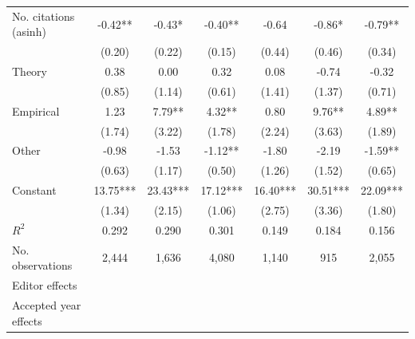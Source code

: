 \begin{table}
\begin{threeparttable}
\begin{tabular}{p{3.78cm}S@{}S@{}S@{}S@{}S@{}S@{}}
            No. citations (asinh)         &       -0.42** &       -0.43*  &       -0.40** &       -0.64   &       -0.86*  &       -0.79** \\
                                          &      (0.20)   &      (0.22)   &      (0.15)   &      (0.44)   &      (0.46)   &      (0.34)   \\
            Theory                        &        0.38   &        0.00   &        0.32   &        0.08   &       -0.74   &       -0.32   \\
                                          &      (0.85)   &      (1.14)   &      (0.61)   &      (1.41)   &      (1.37)   &      (0.71)   \\
            Empirical                     &        1.23   &        7.79** &        4.32** &        0.80   &        9.76** &        4.89** \\
                                          &      (1.74)   &      (3.22)   &      (1.78)   &      (2.24)   &      (3.63)   &      (1.89)   \\
            Other                         &       -0.98   &       -1.53   &       -1.12** &       -1.80   &       -2.19   &       -1.59** \\
                                          &      (0.63)   &      (1.17)   &      (0.50)   &      (1.26)   &      (1.52)   &      (0.65)   \\
            Constant                      &       13.75***&       23.43***&       17.12***&       16.40***&       30.51***&       22.09***\\
                                          &      (1.34)   &      (2.15)   &      (1.06)   &      (2.75)   &      (3.36)   &      (1.80)   \\
            \midrule
            \(R^2\)                       &       0.292   &       0.290   &       0.301   &       0.149   &       0.184   &       0.156   \\
            No. observations              &       2,444   &       1,636   &       4,080   &       1,140   &         915   &       2,055   \\
            \midrule
            Editor effects        &           {}   &           {}   &           {}   &           {}   &           {}   &           {}   \\
            Accepted year effects         &           {}   &           {}   &               &           {}   &           {}   &               \\

\end{tabular}
\end{threeparttable}
\end{table}
